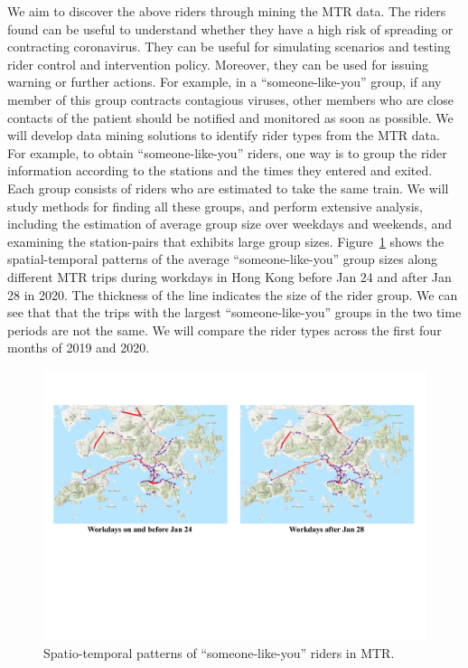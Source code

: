 \documentclass[11pt]{article}
\begin{document}
We aim to discover the above riders through mining the MTR data. The riders found can be useful to understand whether they have a high risk of spreading or contracting coronavirus.  They can be useful for simulating scenarios and testing rider control and intervention policy. Moreover, they can be used for issuing warning or further actions. For example, in a ``someone-like-you'' group, if any member of this group contracts contagious viruses, other members who are close contacts of the patient should be notified and monitored as soon as possible.  We will develop data mining solutions to identify rider types from the MTR data. For example, to obtain ``someone-like-you'' riders, one way is to group the rider information according to the stations and the times they entered and exited. Each group consists of riders who are estimated to take the same train.  
We will study methods for finding all these groups, and perform extensive analysis, including the estimation of average group size over weekdays and weekends, and examining the station-pairs that exhibits large group sizes.  Figure~\ref{fig:HK-familiar} shows the  spatial-temporal patterns of the average ``someone-like-you'' group sizes along different MTR trips during workdays in Hong Kong before Jan 24 and after Jan 28 in 2020. The thickness of the line indicates the size of the rider group. We can see that that the trips with the largest ``someone-like-you'' groups in the two time periods are not the same. We will compare the rider types across the first four months of 2019 and 2020. 

\begin{figure}[!hbt]
	\centering
	\includegraphics[width=\columnwidth]{submissions/reynold/figs/HK-familiar.pdf}
	\caption{Spatio-temporal patterns of ``someone-like-you'' riders in MTR. }
	\label{fig:HK-familiar}
\end{figure}
\end{document}
